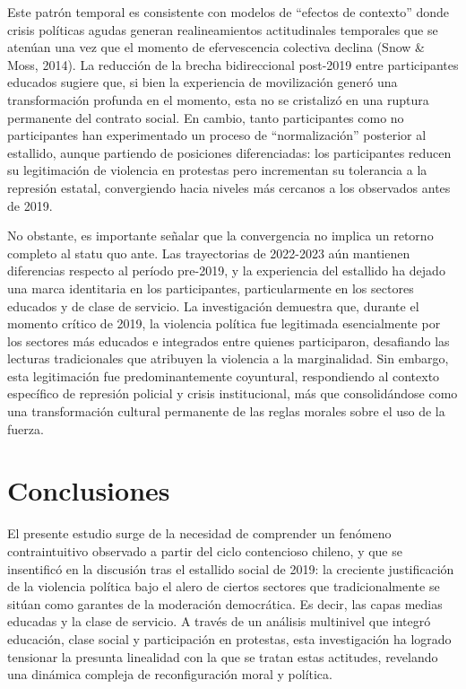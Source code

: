 \documentclass[
  13pt,
]{article}
\begin{document}
Este patrón temporal es consistente con modelos de ``efectos de
contexto'' donde crisis políticas agudas generan realineamientos
actitudinales temporales que se atenúan una vez que el momento de
efervescencia colectiva declina (Snow \& Moss, 2014). La reducción de la
brecha bidireccional post-2019 entre participantes educados sugiere que,
si bien la experiencia de movilización generó una transformación
profunda en el momento, esta no se cristalizó en una ruptura permanente
del contrato social. En cambio, tanto participantes como no
participantes han experimentado un proceso de ``normalización''
posterior al estallido, aunque partiendo de posiciones diferenciadas:
los participantes reducen su legitimación de violencia en protestas pero
incrementan su tolerancia a la represión estatal, convergiendo hacia
niveles más cercanos a los observados antes de 2019.

No obstante, es importante señalar que la convergencia no implica un
retorno completo al statu quo ante. Las trayectorias de 2022-2023 aún
mantienen diferencias respecto al período pre-2019, y la experiencia del
estallido ha dejado una marca identitaria en los participantes,
particularmente en los sectores educados y de clase de servicio. La
investigación demuestra que, durante el momento crítico de 2019, la
violencia política fue legitimada esencialmente por los sectores más
educados e integrados entre quienes participaron, desafiando las
lecturas tradicionales que atribuyen la violencia a la marginalidad. Sin
embargo, esta legitimación fue predominantemente coyuntural,
respondiendo al contexto específico de represión policial y crisis
institucional, más que consolidándose como una transformación cultural
permanente de las reglas morales sobre el uso de la fuerza.

\section{Conclusiones}\label{conclusiones}

El presente estudio surge de la necesidad de comprender un fenómeno
contraintuitivo observado a partir del ciclo contencioso chileno, y que
se insentificó en la discusión tras el estallido social de 2019: la
creciente justificación de la violencia política bajo el alero de
ciertos sectores que tradicionalmente se sitúan como garantes de la
moderación democrática. Es decir, las capas medias educadas y la clase
de servicio. A través de un análisis multinivel que integró educación,
clase social y participación en protestas, esta investigación ha logrado
tensionar la presunta linealidad con la que se tratan estas actitudes,
revelando una dinámica compleja de reconfiguración moral y política.
\end{document}
